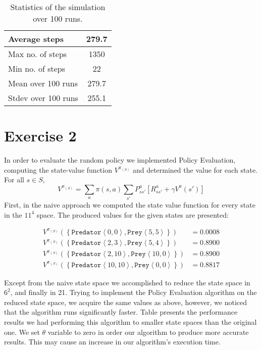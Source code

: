 \documentclass[a4paper,11pt]{article}
\newcommand{\Pred}[2]{\ensuremath{\mathtt{Predator}\left<#1, #2\right>}}
\newcommand{\Prey}[2]{\ensuremath{\mathtt{Prey}\left<#1, #2\right>}}
\begin{document}
\begin{table}[h!]
\caption{Statistics of the simulation over 100 runs.}
\label{tab:SimStat}
\begin{center}
\begin{small}
\begin{tabular}{|@{ }l@{ }|@{ }c@{ }|}
    \hline
      Average steps & 279.7 \\ \hline
      Max no. of steps & 1350   \\ \hline
      Min no. of steps & 22 \\ \hline
      Mean over 100 runs & 279.7  \\ \hline
      Stdev over 100 runs & 255.1 \\
    \hline
    \end{tabular}      
\end{small}
\end{center}  
\end{table}

\section*{Exercise 2}
In order to evaluate the random policy we implemented Policy Evaluation, computing the state-value function $V^{\pi_{(S)}}$ and determined the value for each state. For all $s \in S$,
\[
V^{\pi_{(S)}} = \sum_{a}\pi(s,a)\sum_{s'}P_{ss'}^a[R_{ss'}^a + \gamma V^{\pi}(s')]
\]
First, in the naive approach we computed the state value function for every state in the $11^{4}$ space. The produced values for the given states are presented:

\begin{align*}
  V^{\pi_{(S)}}(\left\{\Pred{0}{0},\Prey{5}{5}\right\})   & = 0.0008 \\
    V^{\pi_{(S)}}(\left\{\Pred{2}{3},\Prey{5}{4}\right\})   &= 0.8900 \\
    V^{\pi_{(S)}}(\left\{\Pred{2}{10},\Prey{10}{0}\right\}) &= 0.8900 \\
    V^{\pi_{(S)}}(\left\{\Pred{10}{10},\Prey{0}{0}\right\}) &= 0.8817
\end{align*}

Except from the naive state space we accomplished to reduce the state space in $6^2$, and finally in 21. Trying to implement the Policy Evaluation algorithm on the reduced state space, we acquire the same values as above, however, we noticed that the algorithm runs significantly faster. Table presents the performance results we had performing this algorithm to smaller state spaces than the original one. We set $\theta$ variable to zero in order our algorithm to produce more accurate results. This may cause an increase in our algorithm's execution time.
\end{document}
